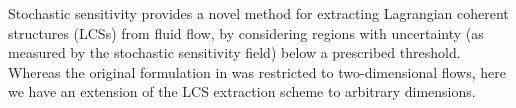



Stochastic sensitivity provides a novel method for extracting Lagrangian coherent structures (LCSs) \cite{BalasuriyaEtAl_2018_GeneralizedLagrangianCoherent, HadjighasemEtAl_2017_CriticalComparisonLagrangian} from fluid flow, by considering regions with uncertainty (as measured by the stochastic sensitivity field) below a prescribed threshold. 
Whereas the original formulation in \cite{Balasuriya_2020_StochasticSensitivityComputable} was restricted to two-dimensional flows, here we have an extension of the LCS extraction scheme to arbitrary dimensions. 


